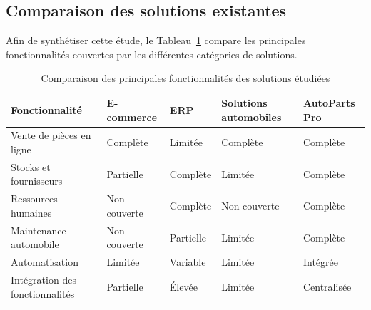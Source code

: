 \subsection{Comparaison des solutions existantes}

Afin de synthétiser cette étude, le Tableau~\ref{tab:comparaison_existant} compare les principales fonctionnalités couvertes par les différentes catégories de solutions.

\begin{table}[H]
    \centering

    \caption{Comparaison des principales fonctionnalités des solutions étudiées}
    \label{tab:comparaison_existant}

    \renewcommand{\arraystretch}{1.4}

    \begin{tabular}{|p{4cm}|p{2.5cm}|p{2cm}|p{3cm}|p{3cm}|}
        \hline

        \textbf{Fonctionnalité} &
        \textbf{E-commerce} &
        \textbf{\ac{ERP}} &
        \textbf{Solutions automobiles} &
        \textbf{AutoParts Pro} \\

        \hline

        Vente de pièces en ligne &
        Complète &
        Limitée &
        Complète &
        Complète \\

        \hline

        Stocks et fournisseurs &
        Partielle &
        Complète &
        Limitée &
        Complète \\

        \hline

        Ressources humaines &
        Non couverte &
        Complète &
        Non couverte &
        Complète \\

        \hline

        Maintenance automobile &
        Non couverte &
        Partielle &
        Limitée &
        Complète \\

        \hline

        Automatisation &
        Limitée &
        Variable &
        Limitée &
        Intégrée \\

        \hline

        Intégration des fonctionnalités &
        Partielle &
        Élevée &
        Limitée &
        Centralisée \\

        \hline

    \end{tabular}
\end{table}

